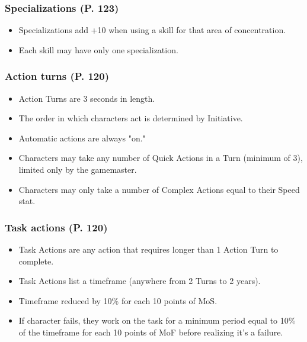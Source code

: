 \subsubsection{Specializations (P. 123)}

\begin{itemize}
\item Specializations add +10 when using a skill for that area of concentration.
\item Each skill may have only one specialization.
\end{itemize}

\subsubsection{Action turns (P. 120)}

\begin{itemize}
\item Action Turns are 3 seconds in length.
\item The order in which characters act is determined by Initiative.
\item Automatic actions are always "on."
\item Characters may take any number of Quick Actions in a Turn (minimum of 3), limited only by the gamemaster.
\item Characters may only take a number of Complex Actions equal to their Speed stat.
\end{itemize}

\subsubsection{Task actions (P. 120)}

\begin{itemize}
\item Task Actions are any action that requires longer than 1 Action Turn to complete.
\item Task Actions list a timeframe (anywhere from 2 Turns to 2 years).
\item Timeframe reduced by 10\% for each 10 points of MoS.
\item If character fails, they work on the task for a minimum period equal to 10\% of the timeframe for each 10 points of MoF before realizing it's a failure.
\end{itemize}

